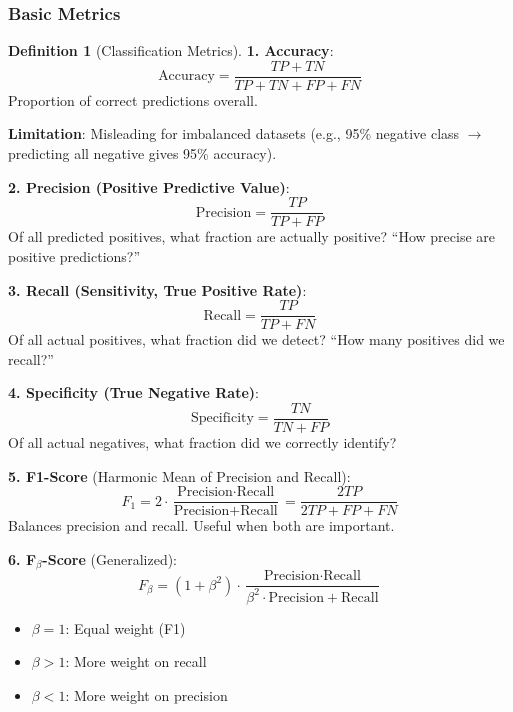 \documentclass[11pt,twoside]{article}
\numberwithin{equation}{section}
\theoremstyle{plain}
\theoremstyle{definition}
\newtheorem{definition}[theorem]{Definition}
\theoremstyle{remark}
\begin{document}
\subsubsection{Basic Metrics}

\begin{definition}[Classification Metrics]

\textbf{1. Accuracy}:
\[
\text{Accuracy} = \frac{TP + TN}{TP + TN + FP + FN}
\]
Proportion of correct predictions overall.

\textbf{Limitation}: Misleading for imbalanced datasets (e.g., 95\% negative class $\to$ predicting all negative gives 95\% accuracy).

\textbf{2. Precision (Positive Predictive Value)}:
\[
\text{Precision} = \frac{TP}{TP + FP}
\]
Of all predicted positives, what fraction are actually positive? ``How precise are positive predictions?''

\textbf{3. Recall (Sensitivity, True Positive Rate)}:
\[
\text{Recall} = \frac{TP}{TP + FN}
\]
Of all actual positives, what fraction did we detect? ``How many positives did we recall?''

\textbf{4. Specificity (True Negative Rate)}:
\[
\text{Specificity} = \frac{TN}{TN + FP}
\]
Of all actual negatives, what fraction did we correctly identify?

\textbf{5. F1-Score} (Harmonic Mean of Precision and Recall):
\[
F_1 = 2 \cdot \frac{\text{Precision} \cdot \text{Recall}}{\text{Precision} + \text{Recall}} = \frac{2TP}{2TP + FP + FN}
\]
Balances precision and recall. Useful when both are important.

\textbf{6. F$_\beta$-Score} (Generalized):
\[
F_\beta = (1 + \beta^2) \cdot \frac{\text{Precision} \cdot \text{Recall}}{\beta^2 \cdot \text{Precision} + \text{Recall}}
\]
\begin{itemize}
\item $\beta = 1$: Equal weight (F1)
\item $\beta > 1$: More weight on recall
\item $\beta < 1$: More weight on precision
\end{itemize}
\end{definition}
\end{document}
